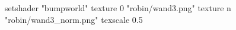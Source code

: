 setshader "bumpworld"
   texture 0 "robin/wand3.png"
   texture n "robin/wand3_norm.png"
texscale 0.5